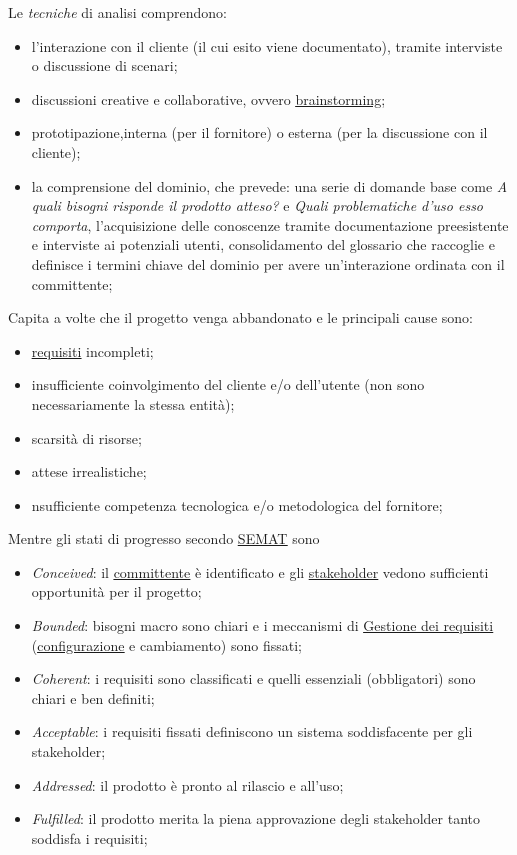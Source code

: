 		Le \textit{tecniche} di analisi comprendono:
			\begin{itemize}
				\item l'interazione con il cliente (il cui esito viene documentato), tramite interviste o discussione di scenari;
				\item discussioni creative e collaborative, ovvero \underline{\hyperref[brainstorming]{brainstorming}};
				\item prototipazione,interna (per il fornitore) o esterna (per la discussione con il cliente);
				\item la comprensione del dominio, che prevede: una serie di domande base come \textit{A quali bisogni risponde il prodotto atteso?} e \textit{Quali problematiche d’uso esso comporta}, l'acquisizione delle conoscenze tramite documentazione preesistente e interviste ai potenziali utenti, consolidamento del glossario che raccoglie e definisce i termini chiave del dominio per avere un'interazione ordinata con il committente;
			\end{itemize}
		
		Capita a volte che il progetto venga abbandonato e le principali cause sono:
			\begin{itemize}
				\item \underline{\hyperref[requirements]{requisiti}} incompleti;
				\item insufficiente coinvolgimento del cliente e/o dell’utente (non sono necessariamente la stessa entità);
				\item scarsità di risorse;
				\item attese irrealistiche;
				\item nsufficiente competenza tecnologica e/o metodologica del fornitore;
			\end{itemize}
		
		Mentre gli stati di progresso secondo \underline{\hyperref[semat]{SEMAT}} sono
			\begin{itemize}
				\item \textit{Conceived}: il \underline{\hyperref[committente]{committente}} è identificato e gli \underline{\hyperref[stakeholder]{stakeholder}} vedono sufficienti opportunità per il progetto;
				\item \textit{Bounded}: bisogni macro sono chiari e i meccanismi di \underline{\hyperref[gestionerequisiti]{Gestione dei requisiti}} (\underline{\hyperref[configurazione]{configurazione}} e cambiamento) sono fissati;
				\item \textit{Coherent}: i requisiti sono classificati e quelli essenziali (obbligatori) sono chiari e ben definiti;
				\item \textit{Acceptable}: i requisiti fissati definiscono un sistema soddisfacente per gli stakeholder;
				\item \textit{Addressed}: il prodotto è pronto al rilascio e all'uso;
				\item \textit{Fulfilled}: il prodotto merita la piena approvazione degli stakeholder tanto soddisfa i requisiti;
			\end{itemize}
		
